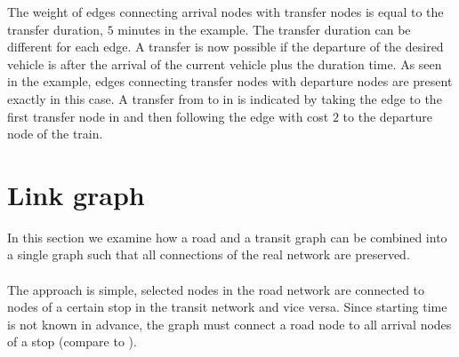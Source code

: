 	The weight of edges connecting arrival nodes with transfer nodes is equal to the transfer duration, $5$ minutes in the example.
	The transfer duration can be different for each edge. A transfer is now possible if the departure of the desired vehicle is after
	the arrival of the current vehicle plus the duration time. As seen in the example, edges connecting transfer nodes with departure
	nodes are present exactly in this case. A transfer from \ticef to \tregios in \offenburg is indicated by taking the edge to the
	first transfer node in \offenburg and then following the edge with cost $2$ to the departure node of the train.
\section{Link graph}\label{linkGraph_sec}
	In this section we examine how a road and a transit graph can be combined into a single graph such that all
	connections of the real network are preserved.\\\\
	The approach is simple, selected nodes in the road network are connected to nodes of a certain stop in
	the transit network and vice versa. Since starting time is not known in advance, the graph must connect a
	road node to all arrival nodes of a stop (compare to ).
	
